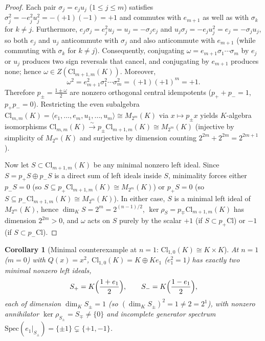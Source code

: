\documentclass[11pt,a4paper]{article}
\theoremstyle{plain}
\newtheorem{corollary}[theorem]{Corollary}
\theoremstyle{definition}
\theoremstyle{remark}
\newcommand{\Cl}{\mathrm{Cl}}
\begin{document}
\begin{proof}
Each pair $\sigma_j = e_j u_j$ ($1 \le j \le m$) satisfies $\sigma_j^2 = -e_j^2 u_j^2 = -(+1)(-1) = +1$ and commutes with $e_{m+1}$ as well as with $\sigma_k$ for $k \neq j$. Furthermore, $e_j \sigma_j = e_j^2 u_j = u_j = -\sigma_j e_j$ and $u_j \sigma_j = -e_j u_j^2 = e_j = -\sigma_j u_j$, so both $e_j$ and $u_j$ anticommute with $\sigma_j$ and also anticommute with $e_{m+1}$ (while commuting with $\sigma_k$ for $k \neq j$). Consequently, conjugating $\omega = e_{m+1}\sigma_1\cdots\sigma_m$ by $e_j$ or $u_j$ produces two sign reversals that cancel, and conjugating by $e_{m+1}$ produces none; hence $\omega \in Z(\Cl_{m+1,m}(K))$. Moreover,
\[
  \omega^2 = e_{m+1}^2 \sigma_1^2 \cdots \sigma_m^2 = (+1)(+1)^m = +1.
\]
Therefore $p_\pm = \frac{1 \pm \omega}{2}$ are nonzero orthogonal central idempotents ($p_+ + p_- = 1$, $p_+ p_- = 0$). Restricting the even subalgebra $\Cl_{m,m}(K) = \langle e_1,\dots,e_m, u_1,\dots,u_m \rangle \cong M_{2^m}(K)$ via $x \mapsto p_\pm x$ yields $K$-algebra isomorphisms $\Cl_{m,m}(K) \xrightarrow{\sim} p_\pm \Cl_{m+1,m}(K) \cong M_{2^m}(K)$ (injective by simplicity of $M_{2^m}(K)$ and surjective by dimension counting $2^{2m} + 2^{2m} = 2^{2m+1}$).

Now let $S \subset \Cl_{m+1,m}(K)$ be any minimal nonzero left ideal. Since $S = p_+ S \oplus p_- S$ is a direct sum of left ideals inside $S$, minimality forces either $p_- S = 0$ (so $S \subseteq p_+ \Cl_{m+1,m}(K) \cong M_{2^m}(K)$) or $p_+ S = 0$ (so $S \subseteq p_- \Cl_{m+1,m}(K) \cong M_{2^m}(K)$). In either case, $S$ is a minimal left ideal of $M_{2^m}(K)$, hence $\dim_K S = 2^m = 2^{(n-1)/2}$, $\ker \rho_S = p_\mp \Cl_{m+1,m}(K)$ has dimension $2^{2m} > 0$, and $\omega$ acts on $S$ purely by the scalar $+1$ (if $S \subset p_+ \Cl$) or $-1$ (if $S \subset p_- \Cl$).
\end{proof}

\begin{corollary}[Minimal counterexample at $n = 1$: $\Cl_{1,0}(K) \cong K \times K$]\label{cor:cl10}
At $n = 1$ ($m = 0$) with $Q(x) = x^2$, $\Cl_{1,0}(K) = K \oplus K e_1$ ($e_1^2 = 1$) has exactly two minimal nonzero left ideals,
\[
  S_+ = K\Bigl(\frac{1 + e_1}{2}\Bigr), \qquad S_- = K\Bigl(\frac{1 - e_1}{2}\Bigr),
\]
each of dimension $\dim_K S_\pm = 1$ (so $(\dim_K S_\pm)^2 = 1 \neq 2 = 2^1$), with nonzero annihilator $\ker \rho_{S_\pm} = S_\mp \neq \{0\}$ and incomplete generator spectrum $\mathrm{Spec}(e_1|_{S_\pm}) = \{\pm 1\} \subsetneq \{+1, -1\}$.
\end{corollary}
\end{document}
